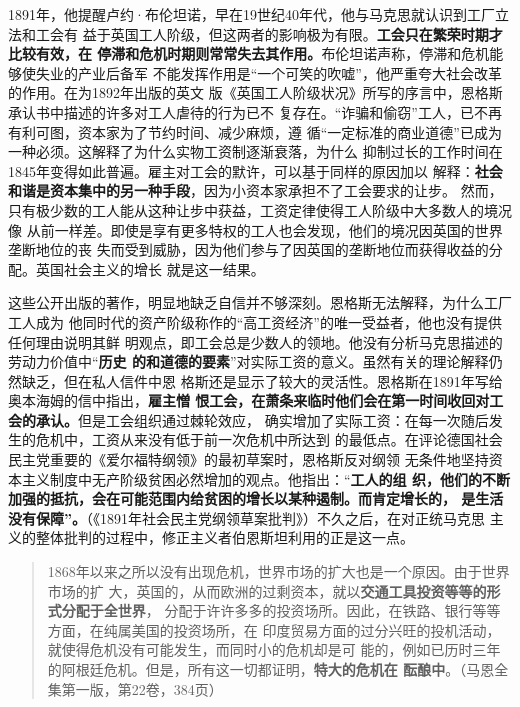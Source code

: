 1891年，他提醒卢约·布伦坦诺，早在19世纪40年代，他与马克思就认识到工厂立法和工会有
益于英国工人阶级，但这两者的影响极为有限。\textbf{工会只在繁荣时期才比较有效，在
  停滞和危机时期则常常失去其作用。}布伦坦诺声称，停滞和危机能够使失业的产业后备军
不能发挥作用是“一个可笑的吹嘘”，他严重夸大社会改革的作用。在为1892年出版的英文
版《英国工人阶级状况》所写的序言中，恩格斯承认书中描述的许多对工人虐待的行为已不
复存在。“诈骗和偷窃”工人，已不再有利可图，资本家为了节约时间、减少麻烦，遵
循“一定标准的商业道德”已成为一种必须。这解释了为什么实物工资制逐渐衰落，为什么
抑制过长的工作时间在1845年变得如此普遍。雇主对工会的默许，可以基于同样的原因加以
解释：\textbf{社会和谐是资本集中的另一种手段}，因为小资本家承担不了工会要求的让步。
然而，只有极少数的工人能从这种让步中获益，工资定律使得工人阶级中大多数人的境况像
从前一样差。即使是享有更多特权的工人也会发现，他们的境况因英国的世界垄断地位的丧
失而受到威胁，因为他们参与了因英国的垄断地位而获得收益的分配。英国社会主义的增长
就是这一结果。

这些公开出版的著作，明显地缺乏自信并不够深刻。恩格斯无法解释，为什么工厂工人成为
他同时代的资产阶级称作的“高工资经济”的唯一受益者，他也没有提供任何理由说明其鲜
明观点，即工会总是少数人的领地。他没有分析马克思描述的劳动力价值中“\textbf{历史
  的和道德的要素}”对实际工资的意义。虽然有关的理论解释仍然缺乏，但在私人信件中恩
格斯还是显示了较大的灵活性。恩格斯在1891年写给奥本海姆的信中指出，\textbf{雇主憎
  恨工会，在萧条来临时他们会在第一时间收回对工会的承认。}但是工会组织通过棘轮效应，
确实增加了实际工资：在每一次随后发生的危机中，工资从来没有低于前一次危机中所达到
的最低点。在评论德国社会民主党重要的《爱尔福特纲领》的最初草案时，恩格斯反对纲领
无条件地坚持资本主义制度中无产阶级贫困必然增加的观点。他指出：“\textbf{工人的组
  织，他们的不断加强的抵抗，会在可能范围内给贫困的增长以某种遏制。而肯定增长的，
  是生活没有保障”。}（《1891年社会民主党纲领草案批判》）不久之后，在对正统马克思
主义的整体批判的过程中，修正主义者伯恩斯坦利用的正是这一点。

\begin{quotation}
  1868年以来之所以没有出现危机，世界市场的扩大也是一个原因。由于世界市场的扩
  大，英国的，从而欧洲的过剩资本，就以\textbf{交通工具投资等等的形式分配于全世界}，
  分配于许许多多的投资场所。因此，在铁路、银行等等方面，在纯属美国的投资场所，在
  印度贸易方面的过分兴旺的投机活动，就使得危机没有可能发生，而同时小的危机却是可
  能的，例如已历时三年的阿根廷危机。但是，所有这一切都证明，\textbf{特大的危机在
    酝酿中}。（马恩全集第一版，第22卷，384页）
\end{quotation}
\vfill

